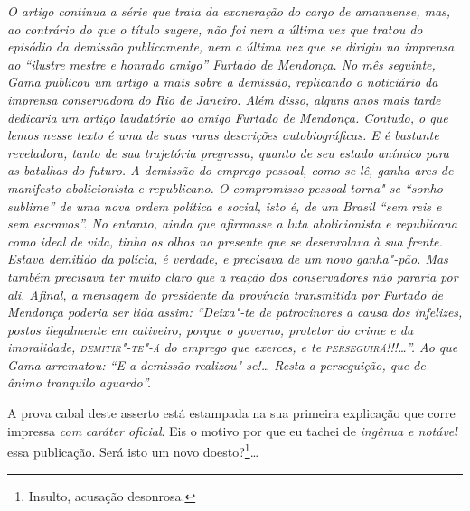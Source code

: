 \begin{flushleft}
{\footnotesize\itshape
O artigo continua a série que trata da exoneração do cargo de
amanuense, mas, ao contrário do que o título sugere, não foi nem a
última vez que tratou do episódio da demissão publicamente, nem a última
vez que se dirigiu na imprensa ao ``ilustre mestre e honrado amigo''
Furtado de Mendonça. No mês seguinte, Gama publicou um artigo a mais
sobre a demissão, replicando o noticiário da imprensa conservadora do
Rio de Janeiro. Além disso, alguns anos mais tarde dedicaria um artigo
laudatório ao amigo Furtado de Mendonça. Contudo, o que lemos nesse texto é uma de
suas raras descrições autobiográficas. E é bastante reveladora, tanto de
sua trajetória pregressa, quanto de seu estado anímico para as batalhas
do futuro. A demissão do emprego pessoal, como se lê, ganha ares de
manifesto abolicionista e republicano. O compromisso pessoal torna"-se
``sonho sublime'' de uma nova ordem política e social, isto é, de um
Brasil ``sem reis e sem escravos''. No entanto, ainda que afirmasse a luta
abolicionista e republicana como ideal de vida, tinha os olhos no
presente que se desenrolava à sua frente. Estava demitido da polícia, é
verdade, e precisava de um novo ganha"-pão. Mas
também precisava ter muito claro que a reação dos conservadores não
pararia por ali. Afinal, a
mensagem do presidente da província transmitida por Furtado de Mendonça
poderia ser lida assim: ``Deixa"-te de patrocinares a causa dos infelizes,
postos ilegalmente em cativeiro, porque o governo, protetor do crime e
da imoralidade, \textsc{demitir"-te"-á} do emprego que exerces, e te
\textsc{perseguirá}!!!\ldots{}''. Ao que Gama arrematou: ``E a demissão realizou"-se!\ldots{} Resta a perseguição, que de ânimo tranquilo aguardo''.}
\end{flushleft}

\noindent{}

A prova cabal deste asserto está estampada na sua primeira explicação
que corre impressa \emph{com} \emph{caráter oficial}. Eis o motivo por
que eu tachei de \emph{ingênua e notável} essa publicação. Será isto um
novo doesto?\footnote{Insulto, acusação desonrosa.}\ldots{}


